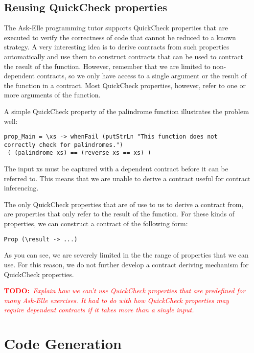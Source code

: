 \documentclass[10pt,a4paper]{article}
\newcommand{\annotate}[3]{
	\begin{scriptsize}
	\textcolor{#1}{\textbf{#2}~\textit{#3}}
	\end{scriptsize}\newline}
\newcommand{\todo}[1]{\annotate{red} {TODO:} {#1}}
\begin{document}
\subsection{Reusing QuickCheck properties}

The Ask-Elle programming tutor supports QuickCheck properties that are executed to verify the correctness of code that cannot be reduced to a known strategy.
A very interesting idea is to derive contracts from such properties automatically and use them to construct contracts that can be used to contract the result of the function.
However, remember that we are limited to non-dependent contracts, so we only have access to a single argument or the result of the function in a contract.
Most QuickCheck properties, however, refer to one or more arguments of the function.

A simple QuickCheck property of the palindrome function illustrates the problem well:

\begin{lstlisting}
prop_Main = \xs -> whenFail (putStrLn "This function does not correctly check for palindromes.") 
 ( (palindrome xs) == (reverse xs == xs) )  
\end{lstlisting}

The input xs must be captured with a dependent contract before it can be referred to.
This means that we are unable to derive a contract useful for contract inferencing.

The only QuickCheck properties that are of use to us to derive a contract from, are properties that only refer to the result of the function.
For these kinds of properties, we can construct a contract of the following form:

\begin{lstlisting}
Prop (\result -> ...)
\end{lstlisting}

As you can see, we are severely limited in the the range of properties that we can use.
For this reason, we do not further develop a contract deriving mechanism for QuickCheck properties.
 
\todo {Explain how we can't use QuickCheck properties that are predefined for many Ask-Elle exercises. It had to do with how QuickCheck properties may require dependent contracts if it takes more than a single input.}

\section{Code Generation}
\label{codegeneration}
\end{document}
